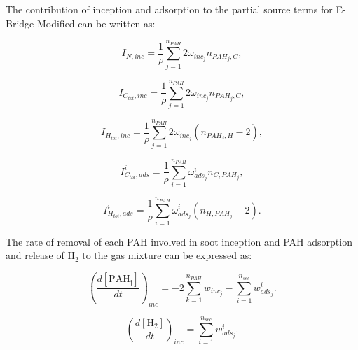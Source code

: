 The contribution of inception and adsorption to the partial source terms for E-Bridge Modified can be written as:

\begin{equation}
	I_{N,{inc}} = \frac{1}{\rho}
	\sum_{j=1}^{n_{PAH}}
	2\omega_{inc_{j}} 
	n_{PAH_j,C}
	\label{eqn:IN_inc_ebri},
\end{equation}

\begin{equation}
	I_{C_{tot},{inc}} = \frac{1}{\rho}
	\sum_{j=1}^{n_{PAH}}
	2\omega_{inc_{j}} 
	n_{PAH_j,C}
	\label{eqn:ICtot_inc_ebri},
\end{equation}

\begin{equation}
	I_{H_{tot},{inc}} = \frac{1}{\rho}
	\sum_{j=1}^{n_{PAH}}
	2\omega_{inc_{j}} 
	\left(
	n_{PAH_j,H}-2
	\right)
	\label{eqn:IHtot_inc_ebri},
\end{equation}

\begin{equation}
	I^i_{C_{tot},ads} =
	\frac{1}{\rho}
	\sum_{i=1}^{n_{PAH}}
	\omega^i_{ads_j}
	n_{C,PAH_j}
	\label{eqn:ICtotads_ebri},
\end{equation}

\begin{equation}
	I^i_{H_{tot},ads} =
	\frac{1}{\rho}
	\sum_{i=1}^{n_{PAH}}
	\omega^i_{ads_j}
	\left(n_{H,PAH_j}-2\right)
	\label{eqn:IHtotads_ebri}.
\end{equation}

The rate of removal of each PAH involved in soot inception and PAH adsorption and release of $\mathrm{H_2}$ to the gas mixture can be expressed as:

\begin{equation}
	\left(
	\frac{d\left[{\mathrm{PAH_j}}\right]}{dt}
	\right)_{inc}
	= 
	-2\sum_{k=1}^{n_{PAH}}w_{inc_{j}}-\sum_{i=1}^{n_{sec}}w^i_{ads_j}
	\label{eqn:PAHscrub_ebri}.
\end{equation}

\begin{equation}
	\left(
	\frac{d\left[{\mathrm{H_2}}\right]}{dt}
	\right)_{inc}
	= 
	\sum_{i=1}^{n_{sec}}w^i_{ads_j}
	\label{eqn:H2scrub_ebri}.
\end{equation}





